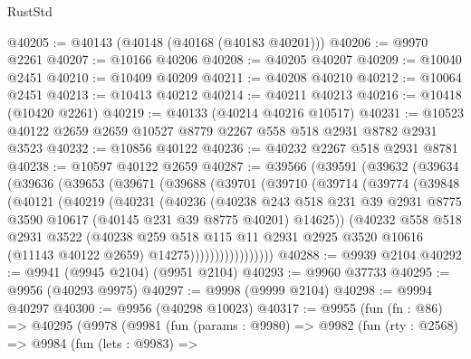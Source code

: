 \begin{lexlean}{RustStd}
\begin{coremodule}
@40205 := @40143 (@40148 (@40168 (@40183 @40201)))
@40206 := @9970 @2261
@40207 := @10166 @40206
@40208 := @40205 @40207
@40209 := @10040 @2451
@40210 := @10409 @40209
@40211 := @40208 @40210
@40212 := @10064 @2451
@40213 := @10413 @40212
@40214 := @40211 @40213
@40216 := @10418 (@10420 @2261)
@40219 := @40133 (@40214 @40216 @10517)
@40231 := @10523 @40122 @2659 @2659 @10527 @8779 @2267 @558 @518 @2931 @8782 @2931 @3523
@40232 := @10856 @40122
@40236 := @40232 @2267 @518 @2931 @8781
@40238 := @10597 @40122 @2659
@40287 := @39566
    (@39591
      (@39632
        (@39634
          (@39636
            (@39653
              (@39671
                (@39688
                  (@39701
                    (@39710
                      (@39714
                        (@39774
                          (@39848
                            (@40121
                              (@40219
                                (@40231
                                  (@40236
                                    (@40238
                                      @243
                                      @518
                                      @231
                                      @39
                                      @2931
                                      @8775
                                      @3590
                                      @10617
                                      (@40145 @231 @39 @8775 @40201)
                                      @14625))
                                  (@40232
                                    @558
                                    @518
                                    @2931
                                    @3522
                                    (@40238
                                      @259
                                      @518
                                      @115
                                      @11
                                      @2931
                                      @2925
                                      @3520
                                      @10616
                                      (@11143 @40122 @2659)
                                      @14275)))))))))))))))))
@40288 := @9939 @2104
@40292 := @9941 (@9945 @2104) (@9951 @2104)
@40293 := @9960 @37733
@40295 := @9956 (@40293 @9975)
@40297 := @9998 (@9999 @2104)
@40298 := @9994 @40297
@40300 := @9956 (@40298 @10023)
@40317 := @9955
    (fun (fn : @86) =>
    @40295
      (@9978
        (@9981
          (fun (params : @9980) =>
          @9982
            (fun (rty : @2568) =>
            @9984
              (fun (lets : @9983) =>

\end{coremodule}
\end{lexlean}
